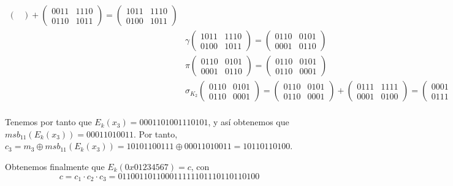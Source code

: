 \documentclass[fleqn]{article}
\begin{document}
\begin{equation*}
\begin{aligned}
\begin{pmatrix}
            \end{pmatrix} +
            \begin{pmatrix}
                0011 & 1110 \\
                0110 & 1011
            \end{pmatrix} =
            \begin{pmatrix}
                1011 & 1110 \\
                0100 & 1011
            \end{pmatrix} \\
            &\gamma \begin{pmatrix}
                1011 & 1110 \\
                0100 & 1011
            \end{pmatrix} =
            \begin{pmatrix}
                0110 & 0101 \\
                0001 & 0110
            \end{pmatrix} \\
            &\pi \begin{pmatrix}
                0110 & 0101 \\
                0001 & 0110
            \end{pmatrix} =
            \begin{pmatrix}
                0110 & 0101 \\
                0110 & 0001
            \end{pmatrix} \\
            &\sigma_{K_2} \begin{pmatrix}
                0110 & 0101 \\
                0110 & 0001
            \end{pmatrix} =
            \begin{pmatrix}
                0110 & 0101 \\
                0110 & 0001
            \end{pmatrix} +
            \begin{pmatrix}
                0111 & 1111 \\
                0001 & 0100
            \end{pmatrix} =
            \begin{pmatrix}
                0001 & 1010 \\
                0111 & 0101
            \end{pmatrix} \\
        \end{aligned}
    \end{equation*}

    Tenemos por tanto que $E_k(x_3) = 0001101001110101$, y así obtenemos que $msb_{11}(E_k(x_3)) = 00011010011$. Por tanto,
    $c_3 = m_3 \oplus msb_{11}(E_k(x_3)) = 10101100111 \oplus 00011010011 = 10110110100$.

    Obtenemos finalmente que $E_k(0x01234567) = c$, con 
    $$c = c_1 \cdot c_2 \cdot c_3 = 011001101100011111101110110110100$$
\end{document}
